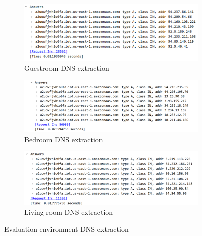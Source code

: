 \begin{figure}[H]
    \centering
    \begin{subfigure}{0.80\textwidth}
        \centering
        \includegraphics[width=\linewidth]{figures/Evaluation_dns_extraction 1.png}
        \caption{Guestroom DNS extraction}
        \label{fig:Evaluation_DNSextraction_1}
    \end{subfigure}
    \hfill
    \begin{subfigure}{0.80\textwidth}
        \centering
        \includegraphics[width=\linewidth]{figures/Evaluation_dns_extraction 2.png}
        \caption{Bedroom DNS extraction}
        \label{fig:Evaluation_DNSextraction_2}
    \end{subfigure}
    \hfill
    \begin{subfigure}{0.80\textwidth}
        \centering
        \includegraphics[width=\linewidth]{figures/Evaluation_dns_extraction 3.png}
        \caption{Living room DNS extraction}
        \label{fig:Evaluation_DNSextraction_3}
    \end{subfigure}
    \caption{Evaluation environment DNS extraction}
    \label{fig:Evaluation_DNSExtraction}
\end{figure}

